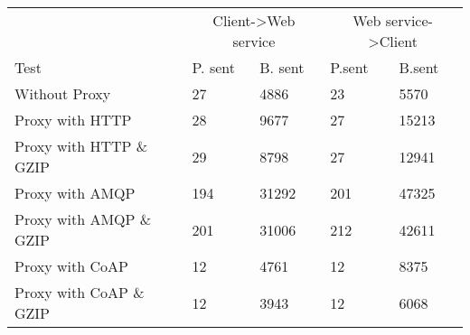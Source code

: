 \begin{tabularx}{\textwidth}{lXXXX}
\hline
\multicolumn{1}{l}{}                  & \multicolumn{2}{c}{Client->Web service}                           & \multicolumn{2}{c}{Web service->Client}                           \\
\multicolumn{1}{l}{Test} & \multicolumn{1}{l}{P. sent} & \multicolumn{1}{l}{B. sent} & \multicolumn{1}{l}{P.sent} & \multicolumn{1}{l}{B.sent} \\ \hline
Without Proxy                   & 27             & 4886           & 23             & 5570           \\
Proxy with HTTP                 & 28             & 9677           & 27             & 15213          \\
Proxy with HTTP \& GZIP         & 29             & 8798           & 27             & 12941          \\
Proxy with AMQP                 & 194            & 31292          & 201            & 47325          \\
Proxy with AMQP \& GZIP         & 201            & 31006          & 212            & 42611          \\
Proxy with CoAP                 & 12             & 4761           & 12             & 8375           \\
Proxy with CoAP \& GZIP         & 12             & 3943           & 12             & 6068           \\
\end{tabularx}
